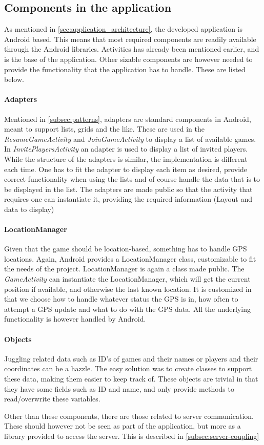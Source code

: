 \subsection{Components in the application}

As mentioned in \ref{sec:application_architecture}, the developed application is Android based. This means that most required components are readily available through the Android libraries. Activities has already been mentioned earlier, and is the base of the application. Other sizable components are however needed to provide the functionality that the application has to handle. These are listed below.

\paragraph{Adapters}
Mentioned in \ref{subsec:patterns}, adapters are standard components in Android, meant to support lists, grids and the like. These are used in the \textit{ResumeGameActivity} and \textit{JoinGameActivity} to display a list of available games. In \textit{InvitePlayersActivity} an adapter is used to display a list of invited players. While the structure of the adapters is similar, the implementation is different each time. One has to fit the adapter to display each item as desired, provide correct functionality when using the lists and of course handle the data that is to be displayed in the list. The adapters are made public so that the activity that requires one can instantiate it, providing the required information (Layout and data to display)

\paragraph{LocationManager}
Given that the game should be location-based, something has to handle GPS locations. Again, Android provides a LocationManager class, customizable to fit the needs of the project. LocationManager is again a class made public. The \textit{GameActivity} can instantiate the LocationManager, which will get the current position if available, and otherwise the last known location. It is customized in that we choose how to handle whatever status the GPS is in, how often to attempt a GPS update and what to do with the GPS data. All the underlying functionality is however handled by Android.

\paragraph{Objects}
Juggling related data such as ID's of games and their names or players and their coordinates can be a hazzle. The easy solution was to create classes to support these data, making them easier to keep track of. These objects are trivial in that they have some fields such as ID and name, and only provide methods to read/overwrite these variables.

Other than these components, there are those related to server communication. These should however not be seen as part of the application, but more as a library provided to access the server. This is described in \ref{subsec:server-coupling}
